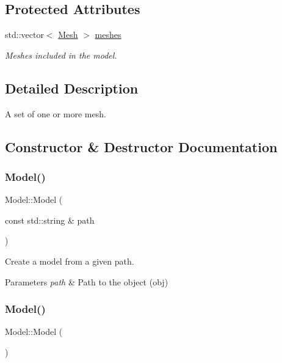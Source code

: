 \subsection*{Protected Attributes}
\begin{DoxyCompactItemize}
\item 
std\+::vector$<$ \hyperlink{classMesh}{Mesh} $>$ \hyperlink{classModel_a538e42901dcfba59471072a48a162163}{meshes}
\begin{DoxyCompactList}\small\item\em Meshes included in the model. \end{DoxyCompactList}\end{DoxyCompactItemize}


\subsection{Detailed Description}
A set of one or more mesh. 

\subsection{Constructor \& Destructor Documentation}
\mbox{\label{classModel_ac455fa8d2babc9ea4d344d585a505ed5}} 
\subsubsection{\texorpdfstring{Model()}{Model()}\hspace{0.1cm}{\footnotesize\ttfamily [1/2]}}
{\footnotesize\ttfamily Model\+::\+Model (\begin{DoxyParamCaption}\item[{const std\+::string \&}]{path }\end{DoxyParamCaption})}



Create a model from a given path. 


\begin{DoxyParams}{Parameters}
{\em path} & Path to the object (obj) \\
\hline
\end{DoxyParams}
\mbox{\label{classModel_ae3b375de5f6df4faf74a95d64748e048}} 
\subsubsection{\texorpdfstring{Model()}{Model()}\hspace{0.1cm}{\footnotesize\ttfamily [2/2]}}
{\footnotesize\ttfamily Model\+::\+Model (\begin{DoxyParamCaption}{ }\end{DoxyParamCaption})\hspace{0.3cm}{\ttfamily [protected]}}



